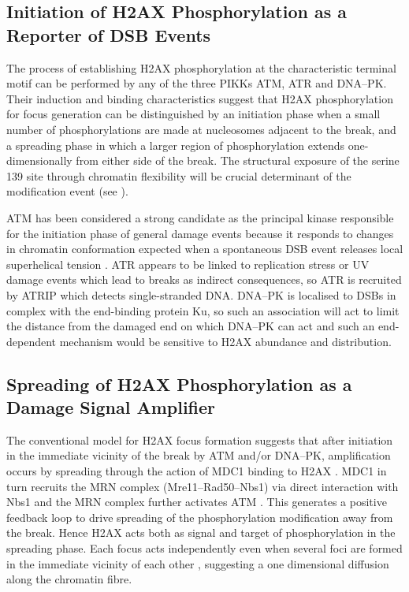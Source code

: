 \subsection{Initiation of H2AX Phosphorylation as a Reporter of DSB Events}
The process of establishing H2AX phosphorylation at the characteristic terminal motif can be performed
by any of the three PIKKs ATM, ATR and DNA--PK\@. Their induction and binding characteristics suggest
that H2AX phosphorylation for focus generation can be distinguished by an initiation phase when a
small number of phosphorylations are made at nucleosomes adjacent to the break, and a spreading phase
in which a larger region of phosphorylation extends one-dimensionally from either side of the break.
The structural exposure of the serine 139 site through chromatin flexibility will be crucial determinant
of the modification event (see ).

ATM has been considered a strong candidate as the principal kinase responsible for the initiation phase
of general damage events because it responds to changes in chromatin conformation expected when a
spontaneous DSB event releases local superhelical tension \citep{CJB03}. ATR appears to be linked to
replication stress or UV damage events which lead to breaks as indirect consequences, so ATR is recruited
by ATRIP which detects single-stranded DNA\@. DNA--PK is localised to DSBs in complex with the end-binding
protein Ku, so such an association will act to limit the distance from the damaged end on which DNA--PK
can act \citep{WCG01} and such an end-dependent mechanism would be sensitive to H2AX abundance and distribution.

\subsection{Spreading of H2AX Phosphorylation as a Damage Signal Amplifier}
The conventional model for \textgamma H2AX focus formation suggests that after initiation in the
immediate vicinity of the break by ATM and/or DNA--PK, amplification occurs by spreading through the
action of MDC1 binding to \textgamma H2AX \citep{MSJAC+05}. MDC1 in turn recruits the MRN complex
(Mre11--Rad50--Nbs1) via direct interaction with Nbs1 \citep{LMS+04} and the MRN complex further activates
ATM \citep{ULM+03}. This generates a positive feedback loop to drive spreading of the phosphorylation
modification away from the break. Hence H2AX acts both as signal and target of phosphorylation in the
spreading phase. Each focus acts independently even when several foci are formed in the immediate
vicinity of each other \citep{MJK+06}, suggesting a one dimensional diffusion along the chromatin fibre.

